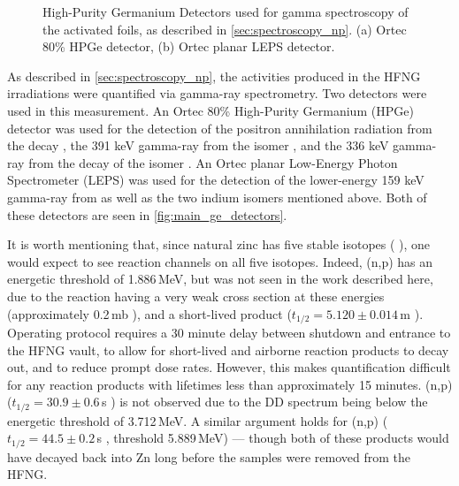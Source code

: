 \begin{figure}
    \centering
    \caption{High-Purity Germanium Detectors used for gamma spectroscopy of the activated foils, as described in \autoref{sec:spectroscopy_np}. (a) Ortec 80\% HPGe detector, (b) Ortec planar LEPS detector.}
     \label{fig:main_ge_detectors}
\end{figure}



As described in \autoref{sec:spectroscopy_np}, the activities produced in the HFNG irradiations were quantified via gamma-ray spectrometry.
Two detectors were used in this measurement.
An Ortec 80\% High-Purity Germanium (HPGe) detector was used for the detection of the positron annihilation radiation from the   decay \cite{Singh2007}, the 391 keV gamma-ray from the   isomer \cite{Blachot2010a}, and the 336 keV gamma-ray from the decay of the   isomer \cite{Blachot2012}.
An Ortec planar Low-Energy Photon Spectrometer (LEPS)  was used for the detection of the lower-energy 159 keV gamma-ray from  \cite{Burrows2007} as well as the two indium isomers mentioned above.
Both of these detectors are seen in \autoref{fig:main_ge_detectors}.




It is worth mentioning that, since natural zinc has five stable isotopes ( \cite{Meija2016}), one would expect to see  
reaction channels on all five isotopes. 
Indeed, (n,p) has an energetic threshold of 1.886\,MeV, but was not seen in the work described here, due to the reaction having a very weak cross section at these energies  (approximately 0.2\,mb \cite{Smith1980}), and a short-lived product ($t_{1/2}=5.120\pm0.014$\,m \cite{Browne2010a}).
Operating protocol requires a 30 minute delay between shutdown and entrance to the HFNG vault, to allow for short-lived and airborne reaction products to decay out, and to reduce prompt dose rates.
However, this makes quantification difficult for any reaction products with lifetimes less than approximately 15 minutes. 
(n,p) ($t_{1/2}=30.9\pm0.6$\,s \cite{McCutchan2012}) is not observed due to the DD spectrum being below the energetic threshold of 3.712\,MeV.
A similar argument holds for (n,p) ($t_{1/2}=44.5\pm0.2$\,s \cite{Gurdal2016}, threshold 5.889\,MeV) --- though both of these products would have decayed back into Zn long before the samples were removed from the HFNG.


